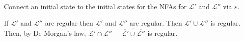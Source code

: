 \documentclass{notes}
\begin{document}
\begin{prf}
  \begin{oldenumerate}[topsep = 0ex, label = {(\alph*)}]
    \item Connect an initial state to the initial states for the NFAs for $\mathcal L'$ and $\mathcal L''$ via $\varepsilon$.
      
    \item If $\mathcal L'$ and $\mathcal L''$ are regular then $\overline{\mathcal L'}$ and $\overline{\mathcal L''}$ are regular.
    Then $\overline{\mathcal L'} \cup \overline{\mathcal L''}$ is regular.
    Then, by De Morgan's law, $\mathcal L' \cap \mathcal L'' = \overline{\overline{\mathcal L'} \cup \overline{\mathcal L''}}$ is regular.
  \end{oldenumerate}
\end{prf}
\end{document}
